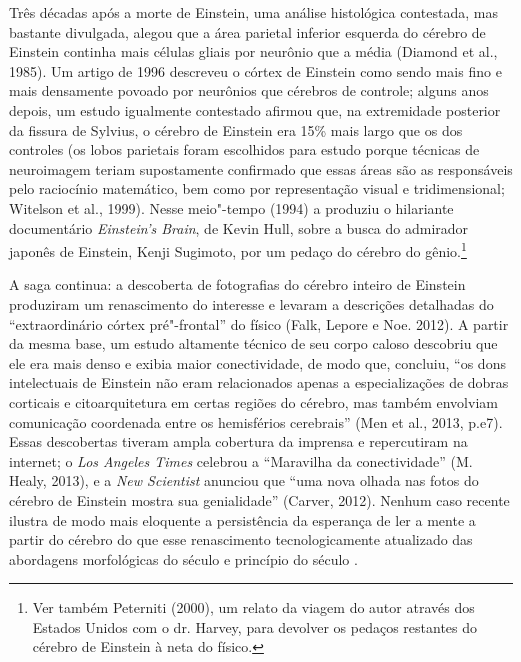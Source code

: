 Três décadas após a morte de Einstein, uma análise histológica
contestada, mas bastante divulgada, alegou que a área parietal inferior
esquerda do cérebro de Einstein continha mais células gliais por
neurônio que a média (Diamond et al., 1985). Um artigo de 1996 descreveu
o córtex de Einstein como sendo mais fino e mais densamente povoado por
neurônios que cérebros de controle; alguns anos depois, um estudo
igualmente contestado afirmou que, na extremidade posterior da fissura de
Sylvius, o cérebro de Einstein era 15\% mais largo que os dos controles (os
lobos parietais foram escolhidos para estudo porque técnicas de
neuroimagem teriam supostamente confirmado que essas áreas são as
responsáveis pelo raciocínio matemático, bem como por representação
visual e tridimensional; Witelson et al., 1999). Nesse meio"-tempo (1994)
a  produziu o hilariante documentário \emph{Einstein's Brain}, de
Kevin Hull, sobre a busca do admirador japonês de Einstein, Kenji
Sugimoto, por um pedaço do cérebro do gênio.\footnote[11]{Ver também Peterniti (2000), um relato da viagem do autor através
dos Estados Unidos com o dr. Harvey, para devolver os pedaços restantes
do cérebro de Einstein à neta do físico.}

A saga continua: a descoberta de fotografias do cérebro inteiro de
Einstein produziram um renascimento do interesse e levaram a descrições
detalhadas do ``extraordinário córtex pré"-frontal'' do físico (Falk,
Lepore e Noe. 2012). A partir da mesma base, um estudo altamente técnico
de seu corpo caloso descobriu que ele era mais denso e exibia maior
conectividade, de modo que, concluiu, ``os dons intelectuais de Einstein
não eram relacionados apenas a especializações de dobras
corticais e citoarquitetura em certas regiões do cérebro, mas também
envolviam comunicação coordenada entre os hemisférios cerebrais'' (Men
et al., 2013, p.e7). Essas descobertas tiveram ampla cobertura da
imprensa e repercutiram na internet; o \emph{Los Angeles Times}
celebrou a ``Maravilha da conectividade'' (M. Healy, 2013), e a
\emph{New Scientist} anunciou que ``uma nova olhada nas fotos do cérebro
de Einstein mostra sua genialidade'' (Carver, 2012). Nenhum caso recente
ilustra de modo mais eloquente a persistência da esperança de ler a
mente a partir do cérebro do que esse renascimento tecnologicamente
atualizado das abordagens morfológicas do século  e princípio do
século .

